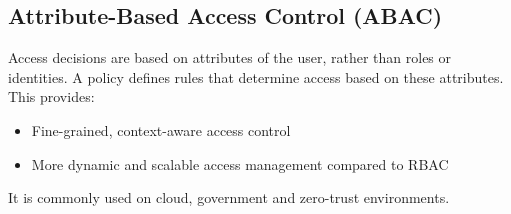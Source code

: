 \documentclass[12pt letter]{report}
\begin{document}
\subsection{Attribute-Based Access Control (ABAC)}

Access decisions are based on attributes of the user, rather than
roles or identities.
A policy defines rules that determine access based on these
attributes. This provides:
\begin{itemize}
  \item Fine-grained, context-aware access control
  \item More dynamic and scalable access management compared to RBAC
\end{itemize}

It is commonly used on cloud, government and zero-trust environments.
\end{document}
